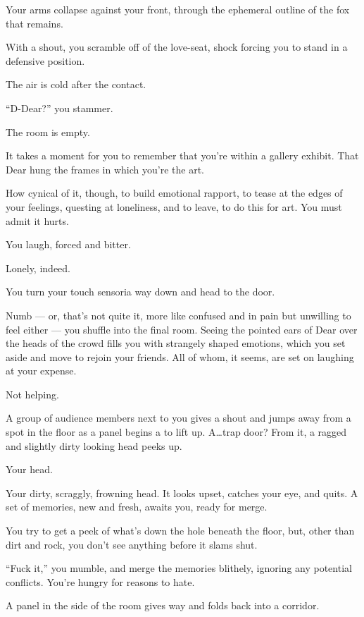 Your arms collapse against your front, through the ephemeral outline of the fox that remains.

With a shout, you scramble off of the love-seat, shock forcing you to stand in a defensive position.

The air is cold after the contact.

``D-Dear?'' you stammer.

The room is empty.
\vfill
\newpage
\null
\vfill

It takes a moment for you to remember that you're within a gallery exhibit. That Dear hung the frames in which you're the art.

How cynical of it, though, to build emotional rapport, to tease at the edges of your feelings, questing at loneliness, and to leave, to do this for art. You must admit it hurts.

You laugh, forced and bitter.

Lonely, indeed.

You turn your touch sensoria way down and head to the door.

\vfill

\newpage
\null
\newpage

Numb --- or, that's not quite it, more like confused and in pain but unwilling to feel either --- you shuffle into the final room. Seeing the pointed ears of Dear over the heads of the crowd fills you with strangely shaped emotions, which you set aside and move to rejoin your friends. All of whom, it seems, are set on laughing at your expense.

Not helping.

A group of audience members next to you gives a shout and jumps away from a spot in the floor as a panel begins a to lift up. A\ldots{}trap door? From it, a ragged and slightly dirty looking head peeks up.

Your head.

Your dirty, scraggly, frowning head. It looks upset, catches your eye, and quits. A set of memories, new and fresh, awaits you, ready for merge.

You try to get a peek of what's down the hole beneath the floor, but, other than dirt and rock, you don't see anything before it slams shut.

``Fuck it,'' you mumble, and merge the memories blithely, ignoring any potential conflicts. You're hungry for reasons to hate.

A panel in the side of the room gives way and folds back into a corridor.

